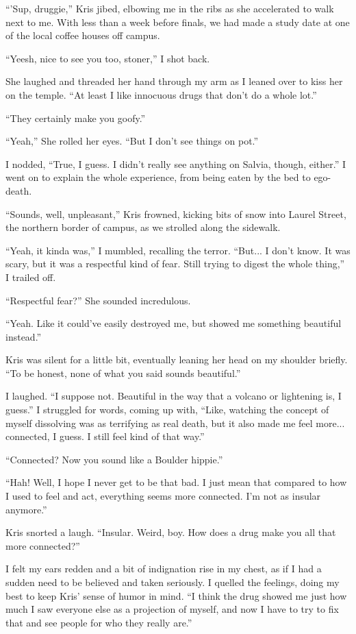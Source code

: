 ``'Sup, druggie,'' Kris jibed, elbowing me in the ribs as she accelerated to walk next to me.  With less than a week before finals, we had made a study date at one of the local coffee houses off campus.

``Yeesh, nice to see you too, stoner,'' I shot back.

She laughed and threaded her hand through my arm as I leaned over to kiss her on the temple.  ``At least I like innocuous drugs that don't do a whole lot.''

``They certainly make you goofy.''

``Yeah,'' She rolled her eyes.  ``But I don't see things on pot.''

I nodded, ``True, I guess.  I didn't really see anything on Salvia, though, either.''  I went on to explain the whole experience, from being eaten by the bed to ego-death.

``Sounds, well, unpleasant,'' Kris frowned, kicking bits of snow into Laurel Street, the northern border of campus, as we strolled along the sidewalk.

``Yeah, it kinda was,'' I mumbled, recalling the terror.  ``But... I don't know.  It was scary, but it was a respectful kind of fear.  Still trying to digest the whole thing,'' I trailed off.

``Respectful fear?''  She sounded incredulous.

``Yeah.  Like it could've easily destroyed me, but showed me something beautiful instead.''

Kris was silent for a little bit, eventually leaning her head on my shoulder briefly.  ``To be honest, none of what you said sounds beautiful.''

I laughed.  ``I suppose not.  Beautiful in the way that a volcano or lightening is, I guess.''  I struggled for words, coming up with, ``Like, watching the concept of myself dissolving was as terrifying as real death, but it also made me feel more... connected, I guess.  I still feel kind of that way.''

``Connected?   Now you sound like a Boulder hippie.''

``Hah!  Well, I hope I never get to be that bad.  I just mean that compared to how I used to feel and act, everything seems more connected.  I'm not as insular anymore.''

Kris snorted a laugh.  ``Insular.  Weird, boy.  How does a drug make you all that more connected?''

I felt my ears redden and a bit of indignation rise in my chest, as if I had a sudden need to be believed and taken seriously.  I quelled the feelings, doing my best to keep Kris' sense of humor in mind.  ``I think the drug showed me just how much I saw everyone else as a projection of myself, and now I have to try to fix that and see people for who they really are.''

